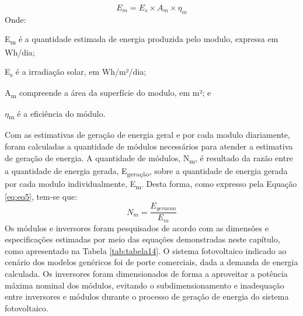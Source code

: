 \begin{equation}\label{eq:eq4}
E_m=E_s \times A_m \times {\eta}_m
\end{equation}
\noindent Onde:\par
\setlength\parindent{1.5cm} E\textsubscript{m} é a quantidade estimada de energia produzida pelo modulo, expressa em Wh/dia;\par
\setlength\parindent{1.5cm} E\textsubscript{s} é a irradiação solar, em Wh/m²/dia;\par
\setlength\parindent{1.5cm} A\textsubscript{m} compreende a área da superfície do modulo, em m²; e\par
\setlength\parindent{1.5cm} \(\eta\)\textsubscript{m} é a eficiência do módulo.\par
\noindent Com as estimativas de geração de energia geral e por cada modulo diariamente, foram calculadas a  quantidade  de  módulos  necessários  para  atender  a  estimativa  de  geração  de  energia.  A quantidade de módulos, N\textsubscript{m}, é resultado da razão entre a quantidade de energia gerada, E\textsubscript{geração}, sobre a quantidade de energia gerada por cada modulo individualmente, E\textsubscript{m}. Desta forma, como expresso pela Equação \ref{eq:eq5}, tem-se que:
\begin{equation}\label{eq:eq5}
N_m=\frac{E_{geracao}}{E_m}
\end{equation}
\noindent Os módulos e inversores foram pesquisados de acordo com as dimensões e especificações estimadas por meio das equações demonstradas neste capítulo, como apresentado na Tabela \ref{tab:tabela14}. O sistema fotovoltaico indicado ao cenário dos modelos genéricos foi de porte comerciais, dada a demanda de energia calculada. Os inversores foram dimensionados de forma a aproveitar a potência máxima nominal dos módulos, evitando o subdimensionamento e inadequação entre inversores e módulos durante o processo de geração de energia do sistema fotovoltaico.